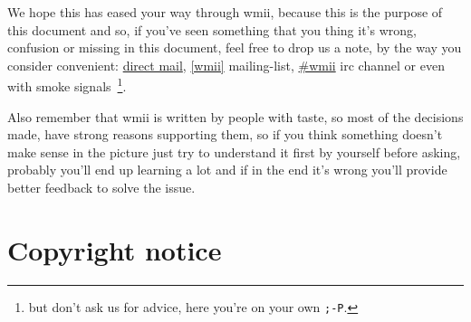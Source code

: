 \documentclass[12pt,a4paper]{article} %
\begin{document}
    We hope this has eased your way through wmii, because this is the
    purpose of this document and so, if you've seen something that you
    thing it's wrong, confusion or missing in this document, feel free
    to drop us a note, by the way you consider convenient:
    \href{http://wmii.de/index.php/BeginnersGuide}{direct mail},
    \href{http://wmii.de/index.php/MailingList}{[wmii]} mailing-list,
    \href{http://wmii.de/index.php/IRC}{\#wmii} irc channel or even
    with smoke signals~\footnote{ but don't ask us for advice, here
    you're on your own \texttt{;-P}.}.
  
    Also remember that wmii is written by people with taste, so most
    of the decisions made, have strong reasons supporting them, so if
    you think something doesn't make sense in the picture just try to
    understand it first by yourself before asking, probably you'll end
    up learning a lot and if in the end it's wrong you'll provide
    better feedback to solve the issue.

\section{Copyright notice}
\end{document}
